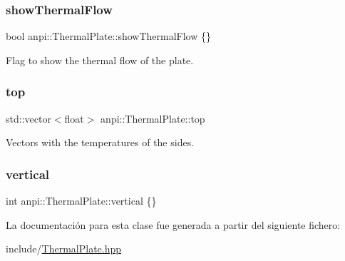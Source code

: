 \subsubsection{\texorpdfstring{show\+Thermal\+Flow}{showThermalFlow}}
{\footnotesize\ttfamily bool anpi\+::\+Thermal\+Plate\+::show\+Thermal\+Flow \{\}\hspace{0.3cm}{\ttfamily [private]}}



Flag to show the thermal flow of the plate. 

\mbox{\label{classanpi_1_1ThermalPlate_af33d6fdc473b7c702a170219add449f0}} 
\subsubsection{\texorpdfstring{top}{top}}
{\footnotesize\ttfamily std\+::vector$<$float$>$ anpi\+::\+Thermal\+Plate\+::top\hspace{0.3cm}{\ttfamily [private]}}



Vectors with the temperatures of the sides. 

\mbox{\label{classanpi_1_1ThermalPlate_a852ee99fadbce99f511a372c47c2d3ee}} 
\subsubsection{\texorpdfstring{vertical}{vertical}}
{\footnotesize\ttfamily int anpi\+::\+Thermal\+Plate\+::vertical \{\}\hspace{0.3cm}{\ttfamily [private]}}



La documentación para esta clase fue generada a partir del siguiente fichero\+:\begin{DoxyCompactItemize}
\item 
include/\hyperlink{ThermalPlate_8hpp}{Thermal\+Plate.\+hpp}\end{DoxyCompactItemize}
